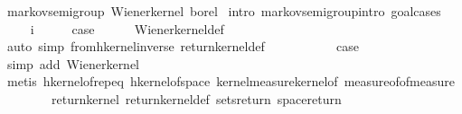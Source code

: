 \begin{isabellebody}
\endisatagproof
{\isafoldproof}%
%
\isadelimproof
\isanewline
%
\endisadelimproof
\isanewline
{}\isamarkupfalse%
\ markov{\isacharunderscore}{\kern0pt}semigroup\ Wiener{\isacharunderscore}{\kern0pt}kernel\ borel\isanewline
%
\isadelimproof
%
\endisadelimproof
%
\isatagproof
{}\isamarkupfalse%
\ {\isacharparenleft}{\kern0pt}intro\ markov{\isacharunderscore}{\kern0pt}semigroup{\isachardot}{\kern0pt}intro{\isacharcomma}{\kern0pt}\ goal{\isacharunderscore}{\kern0pt}cases{\isacharparenright}{\kern0pt}\isanewline
\ \ \isamarkupfalse%
\ {\isacharparenleft}{\kern0pt}{}\ i{\isacharparenright}{\kern0pt}\isanewline
\ \ \isamarkupfalse%
\ \isamarkupfalse%
\ {\isacharquery}{\kern0pt}case\isanewline
\ \ \ \ \isamarkupfalse%
\ Wiener{\isacharunderscore}{\kern0pt}kernel{\isacharunderscore}{\kern0pt}def\ \isanewline
\ \ \ \ \isamarkupfalse%
\ {\isacharparenleft}{\kern0pt}auto\ simp{\isacharcolon}{\kern0pt}\ from{\isacharunderscore}{\kern0pt}hkernel{\isacharunderscore}{\kern0pt}inverse\ return{\isacharunderscore}{\kern0pt}kernel{\isacharunderscore}{\kern0pt}def{\isacharparenright}{\kern0pt}\isanewline
{}\isamarkupfalse%
\isanewline
\ \ \isamarkupfalse%
\ {\isacharparenleft}{\kern0pt}{}\ {\isasymomega}{\isacharparenright}{\kern0pt}\isanewline
\ \ \isamarkupfalse%
\ \isamarkupfalse%
\ {\isacharquery}{\kern0pt}case\isanewline
\ \ \ \ \isamarkupfalse%
\ {\isacharparenleft}{\kern0pt}simp\ add{\isacharcolon}{\kern0pt}\ Wiener{\isacharunderscore}{\kern0pt}kernel{\isacharunderscore}{\kern0pt}{}{\isacharparenright}{\kern0pt}\isanewline
\ \ \ \ \isamarkupfalse%
\ {\isacharparenleft}{\kern0pt}metis\ hkernel{\isacharunderscore}{\kern0pt}of{\isachardot}{\kern0pt}rep{\isacharunderscore}{\kern0pt}eq\ hkernel{\isacharunderscore}{\kern0pt}of{\isacharunderscore}{\kern0pt}space\ kernel{\isacharunderscore}{\kern0pt}measure{\isacharunderscore}{\kern0pt}kernel{\isacharunderscore}{\kern0pt}of\ measure{\isacharunderscore}{\kern0pt}of{\isacharunderscore}{\kern0pt}of{\isacharunderscore}{\kern0pt}measure\isanewline
\ \ \ \ \ \ \ \ return{\isacharunderscore}{\kern0pt}kernel\ return{\isacharunderscore}{\kern0pt}kernel{\isacharunderscore}{\kern0pt}def\ sets{\isacharunderscore}{\kern0pt}return\ space{\isacharunderscore}{\kern0pt}return{\isacharparenright}{\kern0pt}\isanewline
{}\isamarkupfalse%
\isanewline
\ \ \isamarkupfalse%

\end{isabellebody}
